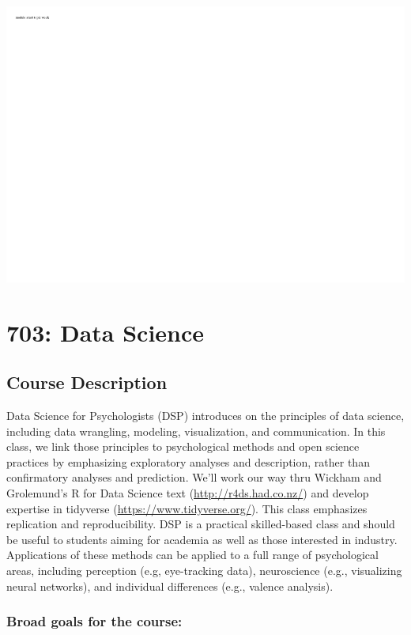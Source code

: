 \includegraphics{0203_testing_files/figure-latex/unnamed-chunk-3-1.pdf}

\hypertarget{data-science}{%
\chapter*{703: Data Science}\label{data-science}}


\hypertarget{course-description-3}{%
\section*{Course Description}\label{course-description-3}}


Data Science for Psychologists (DSP) introduces on the principles of data science, including data wrangling, modeling, visualization, and communication. In this class, we link those principles to psychological methods and open science practices by emphasizing exploratory analyses and description, rather than confirmatory analyses and prediction. We'll work our way thru Wickham and Grolemund's R for Data Science text (\url{http://r4ds.had.co.nz/}) and develop expertise in tidyverse (\url{https://www.tidyverse.org/}). This class emphasizes replication and reproducibility. DSP is a practical skilled-based class and should be useful to students aiming for academia as well as those interested in industry. Applications of these methods can be applied to a full range of psychological areas, including perception (e.g, eye-tracking data), neuroscience (e.g., visualizing neural networks), and individual differences (e.g., valence analysis).

\hypertarget{broad-goals-for-the-course-1}{%
\subsection*{Broad goals for the course:}\label{broad-goals-for-the-course-1}}


